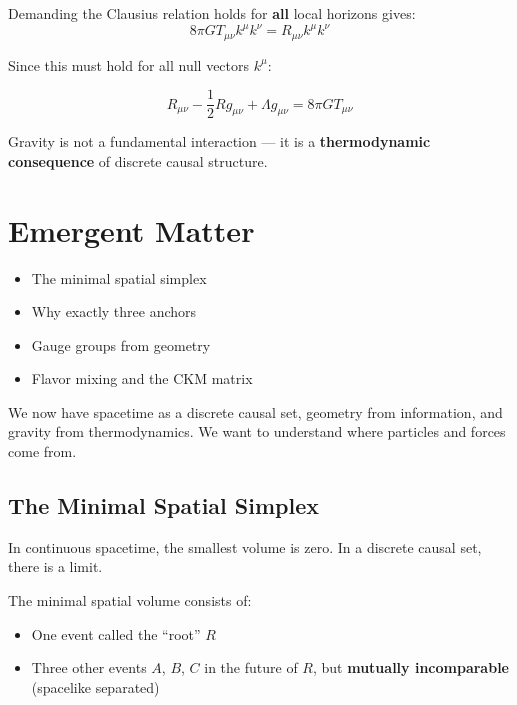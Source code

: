 \documentclass[11pt, a4paper, openany]{book}
\newcounter{theorem}[chapter]
\newenvironment{introduction}[1][Chapter Overview]{%
  \begin{tcolorbox}[
    enhanced,
    colback=structurecolor!5,
    colframe=structurecolor,
    colbacktitle=structurecolor,
    coltitle=white,
    fonttitle=\bfseries,
    title={#1},
    arc=3pt, boxrule=1pt,
    left=10pt, right=10pt, top=8pt, bottom=8pt,
    before skip=15pt, after skip=15pt
  ]
  \begin{itemize}[leftmargin=*, itemsep=3pt]
}{%
  \end{itemize}
  \end{tcolorbox}
}
\begin{document}
Demanding the Clausius relation holds for \textbf{all} local horizons gives:
\begin{equation}
8\pi G T_{\mu\nu} k^\mu k^\nu = R_{\mu\nu} k^\mu k^\nu
\end{equation}

Since this must hold for all null vectors $k^\mu$:

\begin{theorem}
\begin{equation}
R_{\mu\nu} - \frac{1}{2} R g_{\mu\nu} + \Lambda g_{\mu\nu} = 8\pi G T_{\mu\nu}
\end{equation}
\end{theorem}

\begin{result}
Gravity is not a fundamental interaction --- it is a \textbf{thermodynamic consequence} of discrete causal structure.
\end{result}


\chapter{Emergent Matter}

\begin{introduction}
  \item The minimal spatial simplex
  \item Why exactly three anchors
  \item Gauge groups from geometry
  \item Flavor mixing and the CKM matrix
\end{introduction}

We now have spacetime as a discrete causal set, geometry from information, and gravity from thermodynamics.
We want to understand where particles and forces come from.

\section{The Minimal Spatial Simplex}

In continuous spacetime, the smallest volume is zero.
In a discrete causal set, there is a limit.

\begin{definition}[3-Simplex]
The minimal spatial volume consists of:
\begin{itemize}
  \item One event called the ``root'' $R$
  \item Three other events $A$, $B$, $C$ in the future of $R$, but \textbf{mutually incomparable} (spacelike separated)
\end{itemize}
\end{definition}
\end{document}
